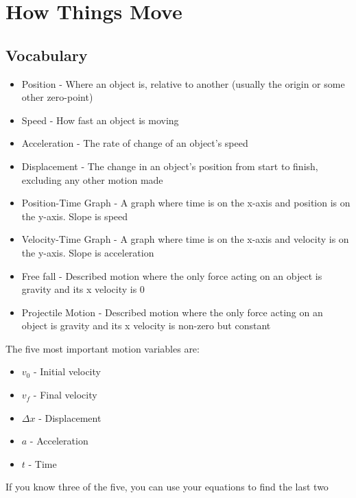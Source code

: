 \section{How Things Move}

\subsection{Vocabulary}
\begin{itemize}
    \item Position - Where an object is, relative to another (usually the origin or some other zero-point)
    \item Speed - How fast an object is moving
    \item Acceleration - The rate of change of an object's speed
    \item Displacement - The change in an object's position from start to finish, excluding any other motion made
    \item Position-Time Graph - A graph where time is on the x-axis and position is on the y-axis. Slope is speed
    \item Velocity-Time Graph - A graph where time is on the x-axis and velocity is on the y-axis. Slope is acceleration
    \item Free fall - Described motion where the only force acting on an object is gravity and its x velocity is 0
    \item Projectile Motion - Described motion where the only force acting on an object is gravity and its x velocity is non-zero but constant
\end{itemize}

The five most important motion variables are:
\begin{itemize}
    \item \(v_0\) - Initial velocity
    \item \(v_f\) - Final velocity
    \item \(\Delta x\) - Displacement
    \item \(a\) - Acceleration
    \item \(t\) - Time
\end{itemize}
If you know three of the five, you can use your equations to find the last two

